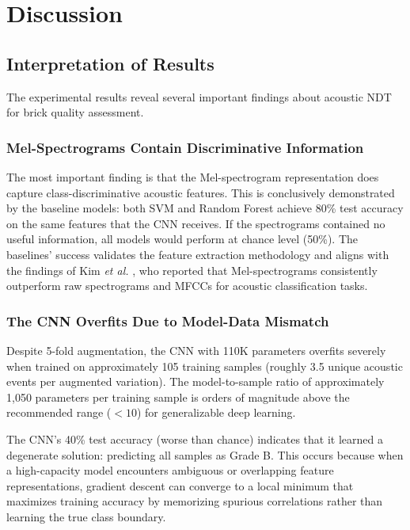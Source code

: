 \documentclass[12pt,a4paper,oneside]{report}
\begin{document}
\chapter{Discussion}
\label{ch:discussion}

\section{Interpretation of Results}

The experimental results reveal several important findings about acoustic NDT for brick quality assessment.

\subsection{Mel-Spectrograms Contain Discriminative Information}

The most important finding is that the Mel-spectrogram representation does capture class-discriminative acoustic features. This is conclusively demonstrated by the baseline models: both SVM and Random Forest achieve 80\% test accuracy on the same features that the CNN receives. If the spectrograms contained no useful information, all models would perform at chance level (50\%). The baselines' success validates the feature extraction methodology and aligns with the findings of Kim \textit{et al.} \cite{kim2025}, who reported that Mel-spectrograms consistently outperform raw spectrograms and MFCCs for acoustic classification tasks.

\subsection{The CNN Overfits Due to Model-Data Mismatch}

Despite 5-fold augmentation, the CNN with 110K parameters overfits severely when trained on approximately 105 training samples (roughly 3.5 unique acoustic events per augmented variation). The model-to-sample ratio of approximately 1,050 parameters per training sample is orders of magnitude above the recommended range (\(<\!10\)) for generalizable deep learning.

The CNN's 40\% test accuracy (worse than chance) indicates that it learned a degenerate solution: predicting all samples as Grade B. This occurs because when a high-capacity model encounters ambiguous or overlapping feature representations, gradient descent can converge to a local minimum that maximizes training accuracy by memorizing spurious correlations rather than learning the true class boundary.
\end{document}
